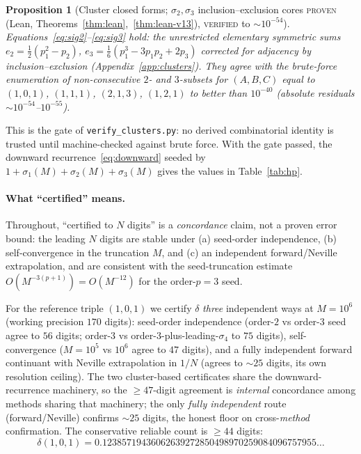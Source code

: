 \documentclass[11pt]{article}
\newtheorem{proposition}{Proposition}
\begin{document}
\begin{proposition}[Cluster closed forms; $\sigma_2,\sigma_3$ inclusion--exclusion
cores \textsc{proven} (Lean, Theorems~\ref{thm:lean},~\ref{thm:lean-v13}),
\textsc{verified} to $\sim10^{-54}$]
\label{prop:sigma}
Equations~\eqref{eq:sig2}--\eqref{eq:sig3} hold: the unrestricted elementary
symmetric sums $e_2=\tfrac12(p_1^2-p_2)$, $e_3=\tfrac16(p_1^3-3p_1p_2+2p_3)$
corrected for adjacency by inclusion--exclusion (Appendix~\ref{app:clusters}). They
agree with the brute-force enumeration of non-consecutive $2$- and $3$-subsets for
$(A,B,C)$ equal to $(1,0,1)$, $(1,1,1)$, $(2,1,3)$, $(1,2,1)$
to better than $10^{-40}$ (absolute residuals $\sim10^{-54}$--$10^{-55}$).
\end{proposition}

This is the gate of \texttt{verify\_clusters.py}: no derived combinatorial identity
is trusted until machine-checked against brute force. With the gate passed, the
downward recurrence~\eqref{eq:downward} seeded by
$1+\sigma_1(M)+\sigma_2(M)+\sigma_3(M)$ gives the values in
Table~\ref{tab:hp}.

\paragraph{What ``certified'' means.} Throughout, ``certified to $N$ digits'' is a
\emph{concordance} claim, not a proven error bound: the leading $N$ digits are stable
under (a) seed-order independence, (b) self-convergence in the truncation $M$, and
(c) an independent forward/Neville extrapolation, and are consistent with the
seed-truncation estimate $O(M^{-3(p+1)})=O(M^{-12})$ for the order-$p{=}3$ seed.

For the reference triple $(1,0,1)$ we certify $\delta$ \emph{three} independent ways
at $M=10^6$ (working precision $170$ digits): seed-order independence (order-$2$ vs
order-$3$ seed agree to $56$ digits; order-$3$ vs order-$3$-plus-leading-$\sigma_4$
to $75$ digits), self-convergence ($M=10^5$ vs $10^6$ agree to $47$ digits), and a
fully independent forward continuant with Neville extrapolation in $1/N$ (agrees to
$\sim25$ digits, its own resolution ceiling). The two cluster-based certificates share
the downward-recurrence machinery, so the $\ge47$-digit agreement is \emph{internal}
concordance among methods sharing that machinery; the only \emph{fully independent} route
(forward/Neville) confirms $\sim25$ digits, the honest floor on cross-\emph{method}
confirmation. The conservative reliable count is
$\ge44$ digits:
\begin{equation}\label{eq:delta101}
  \delta(1,0,1)=0.12385719436062639272850498970259084096757955\ldots
\end{equation}
\end{document}

